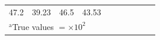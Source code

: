 \begin{table}[t]
\begin{center}
\begin{tabular}{llllllllll}
           47.2
           

        
           &
           
           39.23
           

        
           &
           
           46.5
           

        
           &
           
           43.53
           

         \\


\multicolumn{10}{l}{$^{\mathrm{a}}$True values $ = \times 10^{2}$}
\end{tabular}
\end{center}
\label{T:popresults}
\end{table}

